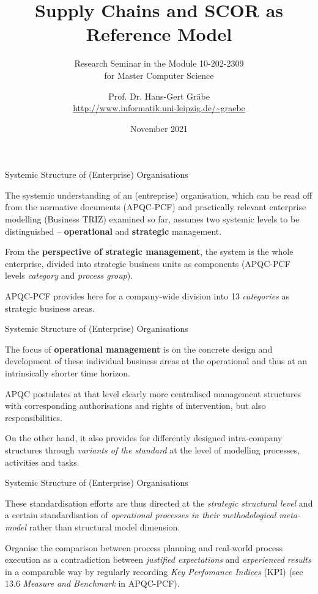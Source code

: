 \documentclass{beamer}
\title{Supply Chains and SCOR as Reference Model}
\subtitle{Research Seminar in the Module 10-202-2309\\ for Master Computer
  Science}
\author{Prof. Dr. Hans-Gert Gräbe\\
\url{http://www.informatik.uni-leipzig.de/~graebe}}
\date{November 2021}
\begin{document}
{
\begin{frame}
  \titlepage
\end{frame}}

\begin{frame}{Systemic Structure of (Enterprise) Organisations}

The systemic understanding of an (entreprise) organisation, which can be read
off from the normative documents (APQC-PCF) and practically relevant
enterprise modelling (Business TRIZ) examined so far, assumes two systemic
levels to be distinguished -- \textbf{operational} and \textbf{strategic}
management.

From the \textbf{perspective of strategic management}, the system is the whole
enterprise, divided into strategic business units as components (APQC-PCF
levels \emph{category} and \emph{process group}).

APQC-PCF provides here for a company-wide division into 13 \emph{categories}
as strategic business areas.
\end{frame}

\begin{frame}{Systemic Structure of (Enterprise) Organisations}

The focus of \textbf{operational management} is on the concrete design and
development of these individual business areas at the operational and thus at
an intrinsically shorter time horizon.

APQC postulates at that level clearly more centralised management structures
with corresponding authorisations and rights of intervention, but also
responsibilities.

On the other hand, it also provides for differently designed intra-company
structures through \emph{variants of the standard} at the level of modelling
processes, activities and tasks.
\end{frame}

\begin{frame}{Systemic Structure of (Enterprise) Organisations}

These standardisation efforts are thus directed at the \emph{strategic
  structural level} and a certain standardisation of \emph{operational
  processes in their methodological meta-model} rather than structural model
dimension.

Organise the comparison between process planning and real-world process
execution as a contradiction between \emph{justified expectations} and
\emph{experienced results} in a comparable way by regularly recording
\emph{Key Perfomance Indices} (KPI) (see 13.6 \emph{Measure and Benchmark} in
APQC-PCF).

\end{frame}
\end{document}

